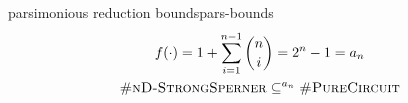 \begin{corollarybox}{ parsimonious reduction bounds}{pars-bounds}
    \begin{gather*}
        f(\cdot) = 1 + \sum_{i = 1}^{n - 1}\binom{n}{i} = 2^n - 1 = a_n \\
        \textnormal{\textsc{\#nD-StrongSperner}} \subseteq^{a_n} \textnormal{\textsc{\#PureCircuit}}
    \end{gather*}
\end{corollarybox}



%

